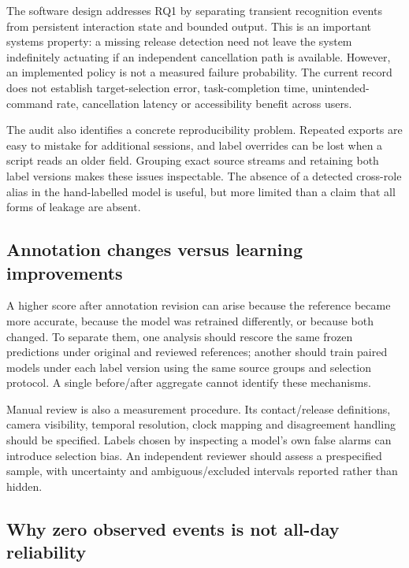 The software design addresses RQ1 by separating transient recognition events from persistent interaction state and bounded output. This is an important systems property: a missing release detection need not leave the system indefinitely actuating if an independent cancellation path is available. However, an implemented policy is not a measured failure probability. The current record does not establish target-selection error, task-completion time, unintended-command rate, cancellation latency or accessibility benefit across users.

The audit also identifies a concrete reproducibility problem. Repeated exports are easy to mistake for additional sessions, and label overrides can be lost when a script reads an older field. Grouping exact source streams and retaining both label versions makes these issues inspectable. The absence of a detected cross-role alias in the hand-labelled model is useful, but more limited than a claim that all forms of leakage are absent.

\subsection{Annotation changes versus learning improvements}\label{annotation-changes-versus-learning-improvements}

A higher score after annotation revision can arise because the reference became more accurate, because the model was retrained differently, or because both changed. To separate them, one analysis should rescore the same frozen predictions under original and reviewed references; another should train paired models under each label version using the same source groups and selection protocol. A single before/after aggregate cannot identify these mechanisms.

Manual review is also a measurement procedure. Its contact/release definitions, camera visibility, temporal resolution, clock mapping and disagreement handling should be specified. Labels chosen by inspecting a model's own false alarms can introduce selection bias. An independent reviewer should assess a prespecified sample, with uncertainty and ambiguous/excluded intervals reported rather than hidden.

\subsection{Why zero observed events is not all-day reliability}\label{why-zero-observed-events-is-not-all-day-reliability}

